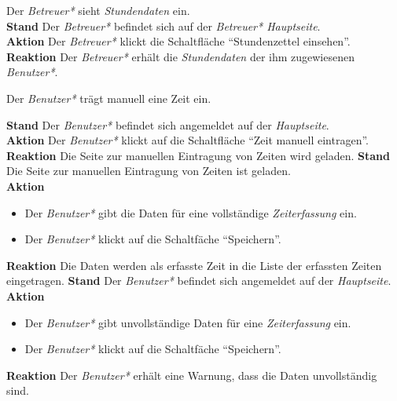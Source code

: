 \begin{requirements}
     Der \emph{Betreuer*} sieht \emph{Stundendaten} ein. \\
        \textbf{Stand} Der \emph{Betreuer*} befindet sich auf der \emph{Betreuer* Hauptseite}. \\
        \textbf{Aktion} Der \emph{Betreuer*} klickt die Schaltfläche "`Stundenzettel einsehen"'. \\
        \textbf{Reaktion} Der \emph{Betreuer*} erhält die \emph{Stundendaten} der ihm zugewiesenen \emph{Benutzer*}.
        
     Der \emph{Benutzer*} trägt manuell eine Zeit ein.
    \begin{requirements}
            \textbf{Stand} Der \emph{Benutzer*} befindet sich angemeldet auf der \emph{Hauptseite}. \\
            \textbf{Aktion} Der \emph{Benutzer*} klickt auf die Schaltfläche "`Zeit manuell eintragen"'. \\
            \textbf{Reaktion} Die Seite zur manuellen Eintragung von Zeiten wird geladen.
            \textbf{Stand} Die Seite zur manuellen Eintragung von Zeiten ist geladen. \\
            \textbf{Aktion} 
                \begin{itemize}
                    \item Der \emph{Benutzer*} gibt die Daten für eine vollständige \emph{Zeiterfassung} ein.
                    \item Der \emph{Benutzer*} klickt auf die Schaltfäche "`Speichern"'.
               \end{itemize}
            \textbf{Reaktion} Die Daten werden als erfasste Zeit in die Liste der erfassten Zeiten eingetragen.
            \textbf{Stand} Der \emph{Benutzer*} befindet sich angemeldet auf der \emph{Hauptseite}. \\
            \textbf{Aktion}
                \begin{itemize}
                    \item Der \emph{Benutzer*} gibt unvollständige Daten für eine \emph{Zeiterfassung} ein.
                    \item Der \emph{Benutzer*} klickt auf die Schaltfäche "`Speichern"'.
                \end{itemize}
            \textbf{Reaktion} Der \emph{Benutzer*} erhält eine Warnung, dass die Daten unvollständig sind.
    \end{requirements}


\end{requirements}
